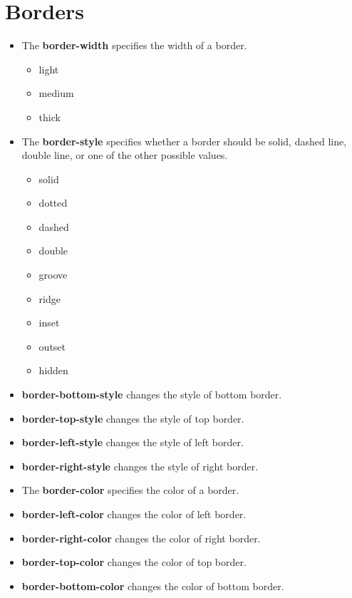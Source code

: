 \documentclass{report}
\begin{document}
    \section{\LARGE Borders}
    \bigbreak \noindent 
    \begin{itemize}
        \item The \textbf{border-width} specifies the width of a border.
            \begin{itemize}
                \item light
                \item medium
                \item thick
            \end{itemize}
        \item The \textbf{border-style} specifies whether a border should be solid, dashed line, double line, or one of the other possible values.
            \begin{itemize}
                \item solid
                \item dotted
                \item dashed
                \item double
                \item groove
                \item ridge
                \item inset
                \item outset
                \item hidden
            \end{itemize}
        \item \textbf{border-bottom-style} changes the style of bottom border.
        \item \textbf{border-top-style} changes the style of top border.
        \item \textbf{border-left-style} changes the style of left border.
        \item \textbf{border-right-style} changes the style of right border.
        \item The \textbf{border-color} specifies the color of a border.
        \item \textbf{border-left-color} changes the color of left border.
        \item \textbf{border-right-color} changes the color of right border.
        \item \textbf{border-top-color} changes the color of top border.
        \item \textbf{border-bottom-color} changes the color of bottom border.

\end{itemize}
\end{document}
